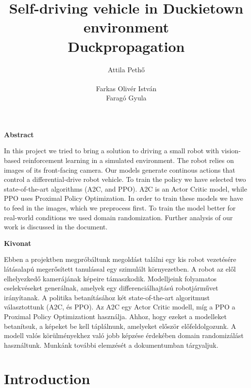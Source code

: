 \documentclass{article}
\title{Self-driving vehicle in Duckietown environment\\
	\large Duckpropagation }
\author{
  Attila Pethő\\\\
   \And  
   Farkas Olivér István \\
   \And
    Faragó Gyula\\
}
\begin{document}

\maketitle



\begin{center}
	\large
	\textbf{Abstract}\\
\end{center}
In this project we tried to bring a solution to driving a small robot with vision-based reinforcement learning in a simulated environment. The robot relies on images of its front-facing camera. Our models generate continous actions that control a differential-drive robot vehicle. To train the policy we have selected two state-of-the-art algorithms (A2C, and PPO). A2C is an Actor Critic model, while PPO uses Proximal Policy Optimization. In order to train these models we have to feed in the images, which we preprocess first. To train the model better for real-world conditions we used domain randomization. Further analysis of our work is discussed in the document.

\begin{center}
	\large
	\textbf{Kivonat}\\
\end{center}

Ebben a projektben megpróbáltunk megoldást találni egy kis robot vezetésére látásalapú megerősített tanulással egy szimulált környezetben. A robot az elől elhelyezkedő kamerájának képeire támaszkodik. Modelljeink folyamatos cselekvéseket generálnak, amelyek egy differenciálhajtású robotjárművet irányítanak. A politika betanításához két state-of-the-art algoritmust választottunk (A2C, és PPO). Az A2C egy Actor Critic modell, míg a PPO a Proximal Policy Optimizationt használja. Ahhoz, hogy ezeket a modelleket betanítsuk, a képeket be kell táplálnunk, amelyeket először előfeldolgozunk. A modell valós körülményekhez való jobb képzése érdekében domain randomizálást használtunk. Munkánk további elemzését a dokumentumban tárgyaljuk.

\section{\large{Introduction}}
\end{document}
